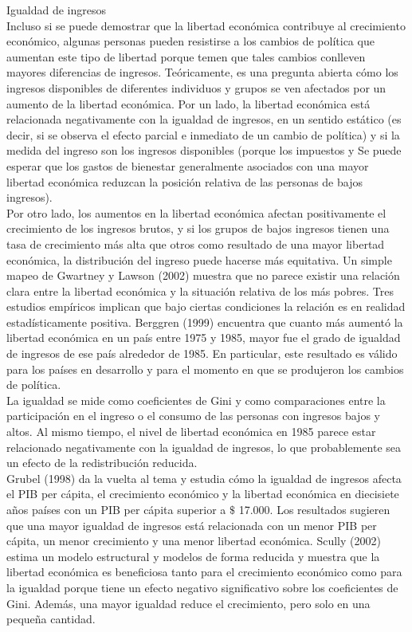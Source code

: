     Igualdad de ingresos\\
    Incluso si se puede demostrar que la libertad económica contribuye al crecimiento económico, algunas personas pueden resistirse a los cambios de política que aumentan este tipo de libertad porque temen que tales cambios conlleven mayores diferencias de ingresos. Teóricamente, es una pregunta abierta cómo los ingresos disponibles de diferentes individuos y grupos se ven afectados por un aumento de la libertad económica. Por un lado, la libertad económica está relacionada negativamente con la igualdad de ingresos, en un sentido estático (es decir, si se observa el efecto parcial e inmediato de un cambio de política) y si la medida del ingreso son los ingresos disponibles (porque los impuestos y Se puede esperar que los gastos de bienestar generalmente asociados con una mayor libertad económica reduzcan la posición relativa de las personas de bajos ingresos). \\
    Por otro lado, los aumentos en la libertad económica afectan positivamente el crecimiento de los ingresos brutos, y si los grupos de bajos ingresos tienen una tasa de crecimiento más alta que otros como resultado de una mayor libertad económica, la distribución del ingreso puede hacerse más equitativa. Un simple mapeo de Gwartney y Lawson (2002) muestra que no parece existir una relación clara entre la libertad económica y la situación relativa de los más pobres. Tres estudios empíricos implican que bajo ciertas condiciones la relación es en realidad estadísticamente positiva. Berggren (1999) encuentra que cuanto más aumentó la libertad económica en un país entre 1975 y 1985, mayor fue el grado de igualdad de ingresos de ese país alrededor de 1985. En particular, este resultado es válido para los países en desarrollo y para el momento en que se produjeron los cambios de política. \\
    La igualdad se mide como coeficientes de Gini y como comparaciones entre la participación en el ingreso o el consumo de las personas con ingresos bajos y altos. Al mismo tiempo, el nivel de libertad económica en 1985 parece estar relacionado negativamente con la igualdad de ingresos, lo que probablemente sea un efecto de la redistribución reducida. \\
    Grubel (1998) da la vuelta al tema y estudia cómo la igualdad de ingresos afecta el PIB per cápita, el crecimiento económico y la libertad económica en diecisiete años países con un PIB per cápita superior a $\$$ 17.000. Los resultados sugieren que una mayor igualdad de ingresos está relacionada con un menor PIB per cápita, un menor crecimiento y una menor libertad económica. Scully (2002) estima un modelo estructural y modelos de forma reducida y muestra que la libertad económica es beneficiosa tanto para el crecimiento económico como para la igualdad porque tiene un efecto negativo significativo sobre los coeficientes de Gini. Además, una mayor igualdad reduce el crecimiento, pero solo en una pequeña cantidad.


